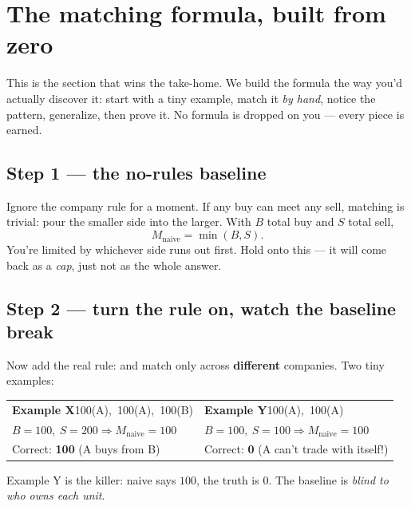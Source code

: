 \section{The matching formula, built from zero}

This is the section that wins the take-home. We build the formula the way you'd
actually discover it: start with a tiny example, match it \emph{by hand}, notice
the pattern, generalize, then prove it. No formula is dropped on you --- every
piece is earned.

\subsection{Step 1 --- the no-rules baseline}

Ignore the company rule for a moment. If any buy can meet any sell, matching is
trivial: pour the smaller side into the larger. With $B$ total buy and $S$ total
sell,
\[
M_{\text{naive}}=\min(B,S).
\]
You're limited by whichever side runs out first. Hold onto this --- it will come
back as a \emph{cap}, just not as the whole answer.

\subsection{Step 2 --- turn the rule on, watch the baseline break}

Now add the real rule: \Buy{} and \Sell{} match only across \textbf{different}
companies. Two tiny examples:

\begin{center}
\begin{tabular}{@{}p{6.6cm}p{6.6cm}@{}}
\textbf{Example X}\newline \Buy{}100(A),\ \Sell{}100(A),\ \Sell{}100(B) &
\textbf{Example Y}\newline \Buy{}100(A),\ \Sell{}100(A) \\[6pt]
$B{=}100,\ S{=}200 \Rightarrow M_{\text{naive}}{=}100$ &
$B{=}100,\ S{=}100 \Rightarrow M_{\text{naive}}{=}100$ \\[4pt]
\textcolor{Buy}{Correct: \textbf{100}} (A buys from B) &
\textcolor{Sell}{Correct: \textbf{0}} (A can't trade with itself!) \\
\end{tabular}
\end{center}

Example Y is the killer: naive says $100$, the truth is $0$. The baseline is
\emph{blind to who owns each unit}.

